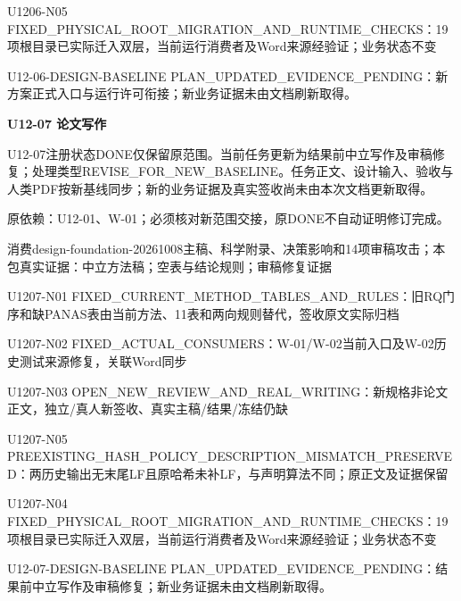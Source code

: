 \documentclass[11pt,a4paper]{article}
\newcommand{\reviewsection}[1]{\par\Needspace{5\baselineskip}\vspace{10pt}\begin{center}{\titlelatin\titlecjk\bfseries\fontsize{14}{20}\selectfont #1}\end{center}}
\begin{document}
U1206-\allowbreak{}N05 FIXED\_\allowbreak{}PHYSICAL\_\allowbreak{}ROOT\_\allowbreak{}MIGRATION\_\allowbreak{}AND\_\allowbreak{}RUNTIME\_\allowbreak{}CHECKS：19项根目录已实际迁入双层，当前运行消费者及Word来源经验证；业务状态不变


U12-\allowbreak{}06-\allowbreak{}DESIGN-\allowbreak{}BASELINE PLAN\_\allowbreak{}UPDATED\_\allowbreak{}EVIDENCE\_\allowbreak{}PENDING：新方案正式入口与运行许可衔接；新业务证据未由文档刷新取得。


\reviewsection{U12-\allowbreak{}07 论文写作}
U12-\allowbreak{}07注册状态DONE仅保留原范围。当前任务更新为结果前中立写作及审稿修复；处理类型REVISE\_\allowbreak{}FOR\_\allowbreak{}NEW\_\allowbreak{}BASELINE。任务正文、设计输入、验收与人类PDF按新基线同步；新的业务证据及真实签收尚未由本次文档更新取得。


原依赖：U12-\allowbreak{}01、W-\allowbreak{}01；必须核对新范围交接，原DONE不自动证明修订完成。


消费design-\allowbreak{}foundation-\allowbreak{}20261008主稿、科学附录、决策影响和14项审稿攻击；本包真实证据：中立方法稿；空表与结论规则；审稿修复证据


U1207-\allowbreak{}N01 FIXED\_\allowbreak{}CURRENT\_\allowbreak{}METHOD\_\allowbreak{}TABLES\_\allowbreak{}AND\_\allowbreak{}RULES：旧RQ门序和缺PANAS表由当前方法、11表和两向规则替代，签收原文实际归档


U1207-\allowbreak{}N02 FIXED\_\allowbreak{}ACTUAL\_\allowbreak{}CONSUMERS：W-\allowbreak{}01/\allowbreak{}W-\allowbreak{}02当前入口及W-\allowbreak{}02历史测试来源修复，关联Word同步


U1207-\allowbreak{}N03 OPEN\_\allowbreak{}NEW\_\allowbreak{}REVIEW\_\allowbreak{}AND\_\allowbreak{}REAL\_\allowbreak{}WRITING：新规格非论文正文，独立/\allowbreak{}真人新签收、真实主稿/\allowbreak{}结果/\allowbreak{}冻结仍缺


U1207-\allowbreak{}N05 PREEXISTING\_\allowbreak{}HASH\_\allowbreak{}POLICY\_\allowbreak{}DESCRIPTION\_\allowbreak{}MISMATCH\_\allowbreak{}PRESERVED：两历史输出无末尾LF且原哈希未补LF，与声明算法不同；原正文及证据保留


U1207-\allowbreak{}N04 FIXED\_\allowbreak{}PHYSICAL\_\allowbreak{}ROOT\_\allowbreak{}MIGRATION\_\allowbreak{}AND\_\allowbreak{}RUNTIME\_\allowbreak{}CHECKS：19项根目录已实际迁入双层，当前运行消费者及Word来源经验证；业务状态不变


U12-\allowbreak{}07-\allowbreak{}DESIGN-\allowbreak{}BASELINE PLAN\_\allowbreak{}UPDATED\_\allowbreak{}EVIDENCE\_\allowbreak{}PENDING：结果前中立写作及审稿修复；新业务证据未由文档刷新取得。
\end{document}

